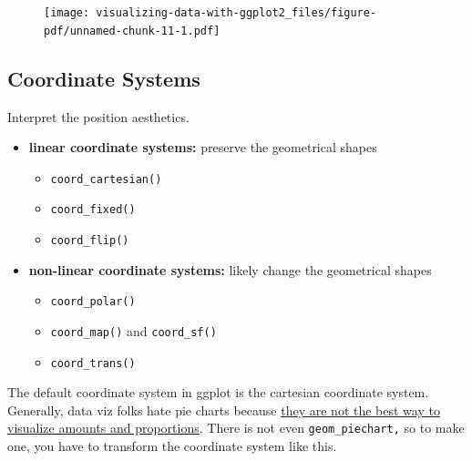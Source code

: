 \documentclass[
  letterpaper,
  DIV=11,
  numbers=noendperiod,
  oneside]{scrreprt}
\providecommand{\tightlist}{%
  \setlength{\itemsep}{0pt}\setlength{\parskip}{0pt}}\usepackage{longtable,booktabs,array}
\begin{document}
\begin{figure}[H]

{\centering \texttt{[image: visualizing-data-with-ggplot2\_files/figure-pdf/unnamed-chunk-11-1.pdf]}

}

\end{figure}

\hypertarget{coordinate-systems}{%
\subsection{Coordinate Systems}\label{coordinate-systems}}

Interpret the position aesthetics.

\begin{itemize}
\tightlist
\item
  \textbf{linear coordinate systems:} preserve the geometrical shapes

  \begin{itemize}
  \tightlist
  \item
    \texttt{coord\_cartesian()}
  \item
    \texttt{coord\_fixed()}
  \item
    \texttt{coord\_flip()}
  \end{itemize}
\item
  \textbf{non-linear coordinate systems:} likely change the geometrical
  shapes

  \begin{itemize}
  \tightlist
  \item
    \texttt{coord\_polar()}
  \item
    \texttt{coord\_map()} and \texttt{coord\_sf()}
  \item
    \texttt{coord\_trans()}
  \end{itemize}
\end{itemize}

The default coordinate system in ggplot is the cartesian coordinate
system. Generally, data viz folks hate pie charts because
\href{https://www.data-to-viz.com/caveat/pie.html}{they are not the best
way to visualize amounts and proportions}. There is not even
\texttt{geom\_piechart,} so to make one, you have to transform the
coordinate system like this.
\end{document}
